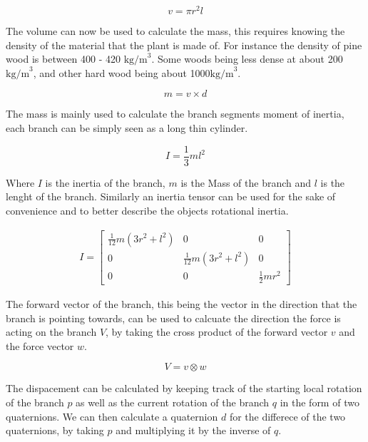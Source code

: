 \begin{equation}
v  = \pi r^2 l
\end{equation}

\noindent
The volume can now be used to calculate the mass, this requires knowing the density of the material that the plant is made of. For instance the density of pine wood is between 400 - 420 $\text{kg/m}^3$. Some woods being less dense at about 200 $\text{kg/m}^3$, and other hard wood being about 1000$\text{kg/m}^3$.

\begin{equation}
m = v \times d
\end{equation}

\noindent
The mass is mainly used to calculate the branch segments moment of inertia, each branch can be simply seen as a long thin cylinder.

\begin{equation}
I = \frac{1}{3} m l ^ 2
\end{equation}

\noindent
Where $I$ is the inertia of the branch, $m$ is the Mass of the branch and $l$ is the lenght of the branch. Similarly an inertia tensor can be used for the sake of convenience and to better describe the objects rotational inertia. 

\begin{equation}
\begin{aligned}
I = \begin{bmatrix}
\frac{1}{12}m(3r^2 + l^2) 	& 0 							& 0 \\
0 							& \frac{1}{12}m(3r^2 + l^2)		& 0 \\
0 							& 0 							& \frac{1}{2}mr^2 
\end{bmatrix}
\end{aligned}
\end{equation}

\noindent
The forward vector of the branch, this being the vector in the direction that the branch is pointing towards, can be used to calcuate the direction the force is acting on the branch $V$, by taking the cross product of the forward  vector $v$ and the force vector $w$.

\begin{equation}
V = v \otimes w
\end{equation}

\noindent
The dispacement can be calculated by keeping track of the starting local rotation of the branch $p$ as well as the current rotation of the branch $q$ in the form of two quaternions. We can then calculate a quaternion $d$ for the differece of the two quaternions, by taking $p$ and multiplying it by the inverse of $q$. 

